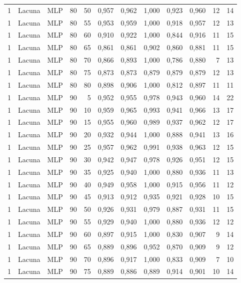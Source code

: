 \begin{longtable}{ccclrrrrrrrr}
1 & Lacuna & MLP & 80 & 50 & 0,957 & 0,962 & 1,000 & 0,923 & 0,960 & 12 & 14 \\
1 & Lacuna & MLP & 80 & 55 & 0,953 & 0,959 & 1,000 & 0,918 & 0,957 & 12 & 13 \\
1 & Lacuna & MLP & 80 & 60 & 0,910 & 0,922 & 1,000 & 0,844 & 0,916 & 11 & 15 \\
1 & Lacuna & MLP & 80 & 65 & 0,861 & 0,861 & 0,902 & 0,860 & 0,881 & 11 & 15 \\
1 & Lacuna & MLP & 80 & 70 & 0,866 & 0,893 & 1,000 & 0,786 & 0,880 & 7 & 13 \\
1 & Lacuna & MLP & 80 & 75 & 0,873 & 0,873 & 0,879 & 0,879 & 0,879 & 12 & 13 \\
1 & Lacuna & MLP & 80 & 80 & 0,898 & 0,906 & 1,000 & 0,812 & 0,897 & 11 & 11 \\
1 & Lacuna & MLP & 90 & 5 & 0,952 & 0,955 & 0,978 & 0,943 & 0,960 & 14 & 22 \\
1 & Lacuna & MLP & 90 & 10 & 0,959 & 0,965 & 0,993 & 0,941 & 0,966 & 13 & 17 \\
1 & Lacuna & MLP & 90 & 15 & 0,955 & 0,960 & 0,989 & 0,937 & 0,962 & 12 & 17 \\
1 & Lacuna & MLP & 90 & 20 & 0,932 & 0,944 & 1,000 & 0,888 & 0,941 & 13 & 16 \\
1 & Lacuna & MLP & 90 & 25 & 0,957 & 0,962 & 0,991 & 0,938 & 0,963 & 12 & 15 \\
1 & Lacuna & MLP & 90 & 30 & 0,942 & 0,947 & 0,978 & 0,926 & 0,951 & 12 & 15 \\
1 & Lacuna & MLP & 90 & 35 & 0,925 & 0,940 & 1,000 & 0,880 & 0,936 & 11 & 13 \\
1 & Lacuna & MLP & 90 & 40 & 0,949 & 0,958 & 1,000 & 0,915 & 0,956 & 11 & 12 \\
1 & Lacuna & MLP & 90 & 45 & 0,913 & 0,912 & 0,935 & 0,921 & 0,928 & 10 & 15 \\
1 & Lacuna & MLP & 90 & 50 & 0,926 & 0,931 & 0,979 & 0,887 & 0,931 & 11 & 15 \\
1 & Lacuna & MLP & 90 & 55 & 0,929 & 0,940 & 1,000 & 0,880 & 0,936 & 12 & 12 \\
1 & Lacuna & MLP & 90 & 60 & 0,897 & 0,915 & 1,000 & 0,830 & 0,907 & 9 & 14 \\
1 & Lacuna & MLP & 90 & 65 & 0,889 & 0,896 & 0,952 & 0,870 & 0,909 & 9 & 12 \\
1 & Lacuna & MLP & 90 & 70 & 0,896 & 0,917 & 1,000 & 0,833 & 0,909 & 7 & 10 \\
1 & Lacuna & MLP & 90 & 75 & 0,889 & 0,886 & 0,889 & 0,914 & 0,901 & 10 & 14 \\

\end{longtable}
